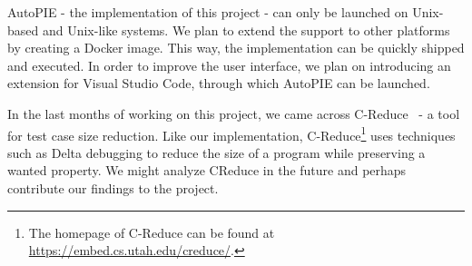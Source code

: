 AutoPIE - the implementation of this project - can only be launched on 
Unix-based and Unix-like systems. 
We plan to extend the support to other platforms by creating a Docker image. 
This way, the implementation can be quickly shipped and executed. 
In order to improve the user interface, we plan on introducing an extension 
for Visual Studio Code, through which AutoPIE can be launched.

In the last months of working on this project, we came across 
C-Reduce~\citep{CReduce12} - a tool for test case size reduction. 
Like our implementation, C-Reduce\footnote{The homepage of C-Reduce can be
found at \url{https://embed.cs.utah.edu/creduce/}.} uses techniques such as 
Delta debugging to reduce the size of a program while preserving a wanted 
property. 
We might analyze CReduce in the future and perhaps contribute our findings 
to the project.
